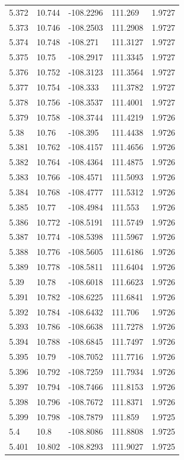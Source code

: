 \begin{tabular}{lllll}
5.372 & 10.744 & -108.2296 & 111.269 & 1.9727 \\
5.373 & 10.746 & -108.2503 & 111.2908 & 1.9727 \\
5.374 & 10.748 & -108.271 & 111.3127 & 1.9727 \\
5.375 & 10.75 & -108.2917 & 111.3345 & 1.9727 \\
5.376 & 10.752 & -108.3123 & 111.3564 & 1.9727 \\
5.377 & 10.754 & -108.333 & 111.3782 & 1.9727 \\
5.378 & 10.756 & -108.3537 & 111.4001 & 1.9727 \\
5.379 & 10.758 & -108.3744 & 111.4219 & 1.9726 \\
5.38 & 10.76 & -108.395 & 111.4438 & 1.9726 \\
5.381 & 10.762 & -108.4157 & 111.4656 & 1.9726 \\
5.382 & 10.764 & -108.4364 & 111.4875 & 1.9726 \\
5.383 & 10.766 & -108.4571 & 111.5093 & 1.9726 \\
5.384 & 10.768 & -108.4777 & 111.5312 & 1.9726 \\
5.385 & 10.77 & -108.4984 & 111.553 & 1.9726 \\
5.386 & 10.772 & -108.5191 & 111.5749 & 1.9726 \\
5.387 & 10.774 & -108.5398 & 111.5967 & 1.9726 \\
5.388 & 10.776 & -108.5605 & 111.6186 & 1.9726 \\
5.389 & 10.778 & -108.5811 & 111.6404 & 1.9726 \\
5.39 & 10.78 & -108.6018 & 111.6623 & 1.9726 \\
5.391 & 10.782 & -108.6225 & 111.6841 & 1.9726 \\
5.392 & 10.784 & -108.6432 & 111.706 & 1.9726 \\
5.393 & 10.786 & -108.6638 & 111.7278 & 1.9726 \\
5.394 & 10.788 & -108.6845 & 111.7497 & 1.9726 \\
5.395 & 10.79 & -108.7052 & 111.7716 & 1.9726 \\
5.396 & 10.792 & -108.7259 & 111.7934 & 1.9726 \\
5.397 & 10.794 & -108.7466 & 111.8153 & 1.9726 \\
5.398 & 10.796 & -108.7672 & 111.8371 & 1.9726 \\
5.399 & 10.798 & -108.7879 & 111.859 & 1.9725 \\
5.4 & 10.8 & -108.8086 & 111.8808 & 1.9725 \\
5.401 & 10.802 & -108.8293 & 111.9027 & 1.9725 \\

\end{tabular}

